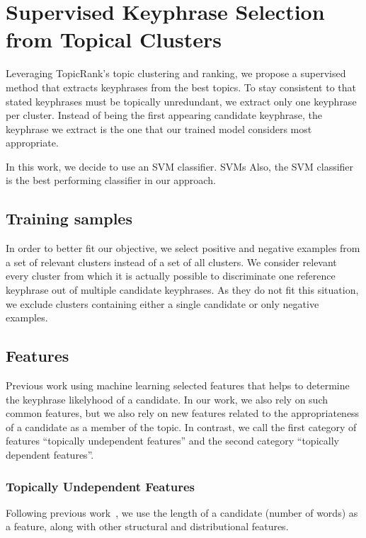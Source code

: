 \section{Supervised Keyphrase Selection\\from Topical Clusters}
\label{sec:supervised_keyphrase_selection_from_topical_clusters}
  Leveraging TopicRank's topic clustering and ranking, we propose a supervised
  method that extracts keyphrases from the best topics. To stay consistent to
   that stated keyphrases must be topically
  unredundant, we extract only one keyphrase per cluster. Instead of being the
  first appearing candidate keyphrase, the keyphrase we extract is the one that
  our trained model considers most appropriate.

  In this work, we decide to use an SVM classifier. SVMs \TODO{\dots} Also, the
  SVM classifier is the best performing classifier in our approach.

  \subsection{Training samples}
  \label{subsec:training_samples}
    In order to better fit our objective, we select positive and negative
    examples from a set of relevant clusters instead of a set of all clusters.
    We consider relevant every cluster from which it is actually possible to
    discriminate one reference keyphrase out of multiple candidate keyphrases.
    As they do not fit this situation, we exclude clusters containing either a
    single candidate or only negative examples.

  \subsection{Features}
  \label{subsec:features}
    Previous work using machine learning selected features that helps to
    determine the keyphrase likelyhood of a candidate. In our work, we also rely
    on such common features, but we also rely on new features related to the
    appropriateness of a candidate as a member of the topic. In contrast, we
    call the first category of features ``topically undependent features'' and
    the second category ``topically dependent features''.

    \subsubsection{Topically Undependent Features}
    \label{subsubsec:topically_undependent_features}
      Following previous
      work~\cite{nguyen2007keadocumentstructure,lopez2010humb}, we use the
      length of a candidate (number of words) as a feature, along with other
      structural and distributional features.


